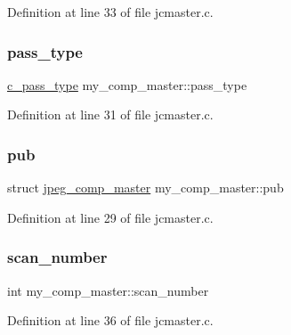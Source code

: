 Definition at line 33 of file jcmaster.\+c.

\mbox{\label{structmy__comp__master_ab153ff271327de71553b428d057e991b}} 
\subsubsection{\texorpdfstring{pass\_type}{pass\_type}}
{\footnotesize\ttfamily \mbox{\hyperlink{jcmaster_8c_af81b2e4b6a71dd23a30397fe937b84d5}{c\+\_\+pass\+\_\+type}} my\+\_\+comp\+\_\+master\+::pass\+\_\+type}



Definition at line 31 of file jcmaster.\+c.

\mbox{\label{structmy__comp__master_a92f91e2f4b79fd0e6ae36f24d8f455f0}} 
\subsubsection{\texorpdfstring{pub}{pub}}
{\footnotesize\ttfamily struct \mbox{\hyperlink{structjpeg__comp__master}{jpeg\+\_\+comp\+\_\+master}} my\+\_\+comp\+\_\+master\+::pub}



Definition at line 29 of file jcmaster.\+c.

\mbox{\label{structmy__comp__master_a85aabce3d888eccfaf21eeb8c5cc8606}} 
\subsubsection{\texorpdfstring{scan\_number}{scan\_number}}
{\footnotesize\ttfamily int my\+\_\+comp\+\_\+master\+::scan\+\_\+number}



Definition at line 36 of file jcmaster.\+c.

\mbox{\label{structmy__comp__master_abc21ff7e11e64247ad8ff68ad819e9fc}} 
